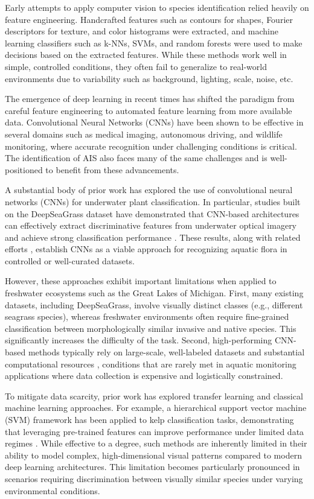 \documentclass[final,3p,times,twocolumn]{elsarticle}
\begin{document}
Early attempts to apply computer vision to species identification relied heavily on feature engineering. Handcrafted features such as contours for shapes, Fourier descriptors for texture, and color histograms were extracted, and machine learning classifiers such as k-NNs, SVMs, and random forests were used to make decisions based on the extracted features. While these methods work well in simple, controlled conditions, they often fail to generalize to real-world environments due to variability such as background, lighting, scale, noise, etc.

The emergence of deep learning in recent times has shifted the paradigm from careful feature engineering to automated feature learning from more available data. Convolutional Neural Networks (CNNs) have been shown to be effective in several domains such as medical imaging, autonomous driving, and wildlife monitoring, where accurate recognition under challenging conditions is critical. The identification of AIS also faces many of the same challenges and is well-positioned to benefit from these advancements.

A substantial body of prior work has explored the use of convolutional neural networks (CNNs) for underwater plant classification. In particular, studies built on the DeepSeaGrass dataset have demonstrated that CNN-based architectures can effectively extract discriminative features from underwater optical imagery and achieve strong classification performance \cite{DeepSeaGrass1, Nawaz2025Seagrass}. These results, along with related efforts \cite{Paul2023LWDS, baos_cnn}, establish CNNs as a viable approach for recognizing aquatic flora in controlled or well-curated datasets.

However, these approaches exhibit important limitations when applied to freshwater ecosystems such as the Great Lakes of Michigan. First, many existing datasets, including DeepSeaGrass, involve visually distinct classes (e.g., different seagrass species), whereas freshwater environments often require fine-grained classification between morphologically similar invasive and native species. This significantly increases the difficulty of the task. Second, high-performing CNN-based methods typically rely on large-scale, well-labeled datasets and substantial computational resources \cite{baos_cnn}, conditions that are rarely met in aquatic monitoring applications where data collection is expensive and logistically constrained.

To mitigate data scarcity, prior work has explored transfer learning and classical machine learning approaches. For example, a hierarchical support vector machine (SVM) framework has been applied to kelp classification tasks, demonstrating that leveraging pre-trained features can improve performance under limited data regimes \cite{Kelps_SVMs}. While effective to a degree, such methods are inherently limited in their ability to model complex, high-dimensional visual patterns compared to modern deep learning architectures. This limitation becomes particularly pronounced in scenarios requiring discrimination between visually similar species under varying environmental conditions.
\end{document}
